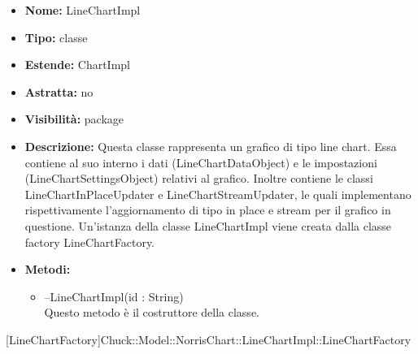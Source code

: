 			
			\begin{itemize}
			\item \textbf{Nome:} LineChartImpl
			\item \textbf{Tipo:} classe
			
		\item \textbf{Estende:}
		ChartImpl
		\item \textbf{Astratta:}
		no
			\item \textbf{Visibilità:} package
			\item \textbf{Descrizione:} Questa classe rappresenta un grafico di tipo line chart. Essa contiene al suo interno i dati (LineChartDataObject) e le impostazioni (LineChartSettingsObject) relativi al grafico. Inoltre contiene le classi LineChartInPlaceUpdater e LineChartStreamUpdater, le quali implementano rispettivamente l'aggiornamento di tipo in place e stream per il grafico in questione. Un'istanza della classe LineChartImpl viene creata dalla classe factory LineChartFactory.
			\item \textbf{Metodi:}
				\begin{itemize}
				\setlength{\itemsep}{5pt}
				
					\item[\ding{111}] {{--LineChartImpl(id : String)}} \\ [1mm] Questo metodo è il costruttore della classe.
				\end{itemize}
		
			\end{itemize}

			
			[LineChartFactory]{Chuck::Model::NorrisChart::LineChartImpl::LineChartFactory}
			

	
